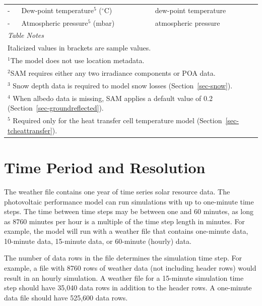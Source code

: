 \documentclass[12pt,letterpaper]{article}
\begin{document}
\begin{table}
\begin{center}
\begin{tabular}{lll}
- & Dew-point temperature$^5$ ($^{\circ}$C)  & dew-point temperature \\
- & Atmospheric pressure$^5$ (mbar)  & atmospheric pressure \\
\midrule
\multicolumn{3}{l}{\textit{Table Notes}}\\
\multicolumn{3}{l}{Italicized values in brackets are sample values.}\\
\multicolumn{3}{l}{$^1$The model does not use location metadata.}\\
\multicolumn{3}{l}{$^2$SAM requires either any two irradiance components or POA data.}\\
\multicolumn{3}{l}{$^3$ Snow depth data is required to model snow losses (Section~\ref{sec-snow}).}\\
\multicolumn{3}{l}{$^4$ When albedo data is missing, SAM applies a default value of 0.2 (Section~\ref{sec-groundreflected}).}\\
\multicolumn{3}{l}{$^5$ Required only for the heat transfer cell temperature model (Section~\ref{sec-tcheattransfer}).}\\
\end{tabular}
\label{tab-wfdata}
\end{center}
\end{table}

\section{Time Period and Resolution}\label{sec-timeconvention}

The weather file contains one year of time series solar resource data. The photovoltaic performance model can run simulations with up to one-minute time steps. The time between time steps may be between one and 60 minutes, as long as 8760 minutes per hour is a multiple of the time step length in minutes. For example, the model will run with a weather file that contains one-minute data, 10-minute data, 15-minute data, or 60-minute (hourly) data.

The number of data rows in the file determines the simulation time step. For example, a file with 8760 rows of weather data (not including header rows) would result in an hourly simulation. A weather file for a 15-minute simulation time step should have 35,040 data rows in addition to the header rows. A one-minute data file should have 525,600 data rows.
\end{document}

